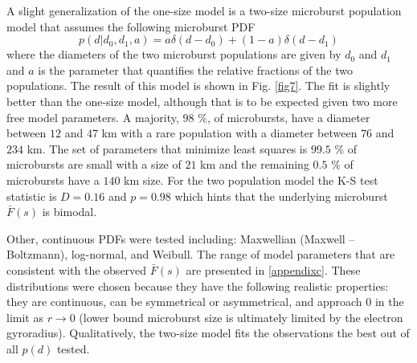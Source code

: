 \documentclass[draft]{agujournal2019}
\begin{document}
A slight generalization of the one-size model is a two-size microburst population model that assumes the following microburst PDF
\begin{equation}
p(d | d_0, d_1, a) = a \delta(d-d_0) + (1-a)\delta(d-d_1)
\end{equation} where the diameters of the two microburst populations are given by $d_0$ and $d_1$ and $a$ is the parameter that quantifies the relative fractions of the two populations. The result of this model is shown in Fig. \ref{fig7}. The fit is slightly better than the one-size model, although that is to be expected given two more free model parameters. A majority, $98$ \%, of microbursts, have a diameter between $12$ and $47$ km with a rare population with a diameter between $76$ and $234$ km. The set of parameters that minimize least squares is $99.5$ \% of microbursts are small with a size of $21$ km and the remaining $0.5$ \% of microbursts have a $140$ km size. For the two population model the K-S test statistic is $D = 0.16$ and $p = 0.98$ which hints that the underlying microburst $\bar{F}(s)$ is bimodal.


Other, continuous PDFs were tested including: Maxwellian (Maxwell -- Boltzmann), log-normal, and Weibull. The range of model parameters that are consistent with the observed $\bar{F}(s)$ are presented in \ref{appendixc}. These distributions were chosen because they have the following realistic properties: they are continuous, can be symmetrical or asymmetrical, and approach 0 in the limit as $r \rightarrow 0$ (lower bound microburst size is ultimately limited by the electron gyroradius). Qualitatively, the two-size model fits the observations the best out of all $p(d)$ tested.
\end{document}
